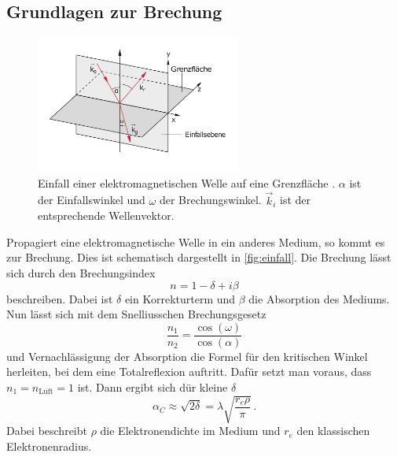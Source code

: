 \subsection{Grundlagen zur Brechung}
\begin{figure}
    \centering
    \includegraphics[width=0.6\textwidth]{pictures/Einfall.pdf}
    \caption{Einfall einer elektromagnetischen Welle auf eine Grenzfläche \cite{demtroeder2}.
    $\alpha$ ist der Einfallswinkel und $\omega$ der Brechungswinkel. $\vec{k}_i$ ist der entsprechende Wellenvektor.}
    \label{fig:einfall}
\end{figure}
Propagiert eine elektromagnetische Welle in ein anderes Medium, so kommt es zur Brechung.
Dies ist schematisch dargestellt in \autoref{fig:einfall}.
Die Brechung lässt sich durch den Brechungsindex
\begin{equation}
    n = 1 - \delta + i \beta
\end{equation}
beschreiben. Dabei ist $\delta$ ein Korrekturterm und $\beta$ die Absorption des Mediums.
Nun lässt sich mit dem Snelliusschen Brechungsgesetz
\begin{equation}
    \frac{n_1}{n_2} = \frac{\cos (\omega)}{\cos (\alpha)}
\end{equation}
und Vernachlässigung der Absorption die Formel für den kritischen Winkel herleiten, bei dem eine Totalreflexion auftritt.
Dafür setzt man voraus, dass $n_1 = n_\text{Luft} = 1$ ist.
Dann ergibt sich dür kleine $\delta$ \cite{tolan_xray}
\begin{equation}
    \alpha_C \approx \sqrt{2 \delta} = \lambda \sqrt{\frac{r_e \rho}{\pi}} \, .
\end{equation}
Dabei beschreibt $\rho$ die Elektronendichte im Medium und $r_e$ den klassischen Elektronenradius.

